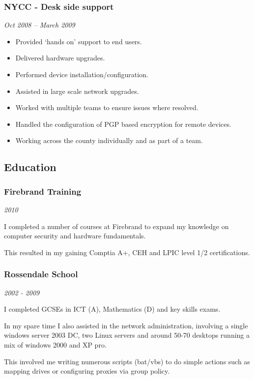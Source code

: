 \subsubsection{NYCC - Desk side support}

\emph{Oct 2008 -- March 2009}

\begin{itemize}
\item
  Provided `hands on' support to end users.
\item
  Delivered hardware upgrades.
\item
  Performed device installation/configuration.
\item
  Assisted in large scale network upgrades.
\item
  Worked with multiple teams to ensure issues where resolved.
\item
  Handled the configuration of PGP based encryption for remote devices.
\item
  Working across the county individually and as part of a team.
\end{itemize}

\subsection{Education}

\subsubsection{Firebrand Training}

\emph{2010}

I completed a number of courses at Firebrand to expand my knowledge on
computer security and hardware fundamentals.

This resulted in my gaining Comptia A+, CEH and LPIC level 1/2
certifications.

\subsubsection{Rossendale School}

\emph{2002 - 2009}

I completed GCSEs in ICT (A), Mathematics (D) and key skills exams.

In my spare time I also assisted in the network administration,
involving a single windows server 2003 DC, two Linux servers and around
50-70 desktops running a mix of windows 2000 and XP pro.

This involved me writing numerous scripts (bat/vbs) to do simple actions
such as mapping drives or configuring proxies via group policy.

